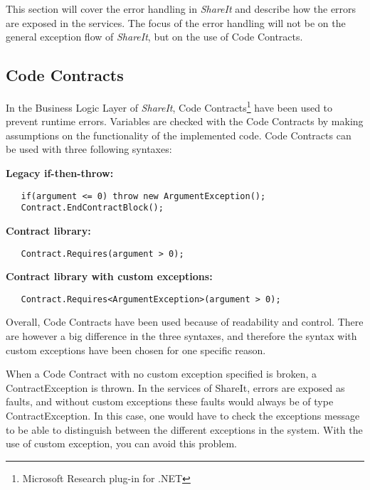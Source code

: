 \documentclass[../report.tex]{subfiles}
\begin{document}
This section will cover the error handling in \textit{ShareIt} and describe how the errors are exposed in the services. The focus of the error handling will not be on the general exception flow of \textit{ShareIt}, but on the use of Code Contracts.

\subsection{Code Contracts}


In the Business Logic Layer of \textit{ShareIt}, Code Contracts\footnote{Microsoft Research plug-in for .NET} have been used to prevent runtime errors. Variables are checked with the Code Contracts by making assumptions on the functionality of the implemented code. Code Contracts can be used with three following syntaxes:

 \textbf{Legacy if-then-throw:}
\begin{lstlisting}
   if(argument <= 0) throw new ArgumentException();  
   Contract.EndContractBlock();
\end{lstlisting}

\textbf{Contract library:}
\begin{lstlisting}
   Contract.Requires(argument > 0);
\end{lstlisting}

\textbf{Contract library with custom exceptions:}
\begin{lstlisting}
   Contract.Requires<ArgumentException>(argument > 0);
\end{lstlisting}

Overall, Code Contracts have been used because of readability and control. There are however a big difference in the three syntaxes, and therefore the syntax with custom exceptions have been chosen for one specific reason. 

When a Code Contract with no custom exception specified is broken, a ContractException is thrown. In the services of ShareIt, errors are exposed as faults, and without custom exceptions these faults would always be of type ContractException. In this case, one would have to check the exceptions message to be able to distinguish between the different exceptions in the system. With the use of custom exception, you can avoid this problem. 
\end{document}
